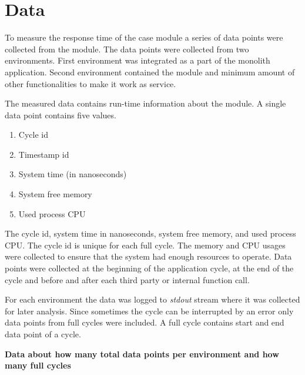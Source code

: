 \section{Data}
To measure the response time of the case module a series of data points were collected from the module.
The data points were collected from two environments.
First environment was integrated as a part of the monolith application.
Second environment contained the module and minimum amount of other functionalities to make it work as service.

The measured data contains run-time information about the module.
A single data point contains five values. 
\begin{enumerate}
    \item Cycle id
    \item Timestamp id
    \item System time (in nanoseconds)
    \item System free memory
    \item Used process CPU
\end{enumerate}

The cycle id, system time in nanoseconds, system free memory, and used process CPU.
The cycle id is unique for each full cycle.
The memory and CPU usages were collected to ensure that the system had enough resources to operate.
Data points were collected at the beginning of the application cycle, at the end of the cycle and before and after each third party or internal function call.

For each environment the data was logged to \textit{stdout} stream where it was collected for later analysis.
Since sometimes the cycle can be interrupted by an error only data points from full cycles were included. A full cycle contains start and end data point of a cycle.

\textbf{Data about how many total data points per environment and how many full cycles}












